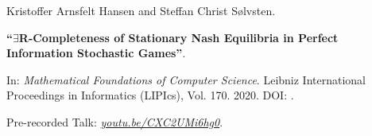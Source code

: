 Kristoffer Arnsfelt Hansen and Steffan Christ Sølvsten.

{\bf ``$\exists$R-Completeness of Stationary Nash Equilibria in Perfect
  Information Stochastic Games''}.

In: \emph{Mathematical Foundations of Computer Science}. Leibniz International
  Proceedings in Informatics (LIPIcs), Vol. 170. 2020.
  DOI: .

\medskip

Pre-recorded Talk: \href{https://youtu.be/CXC2UMi6hg0}{\emph{youtu.be/CXC2UMi6hg0}}.

\label{cite:2020.mfcs}